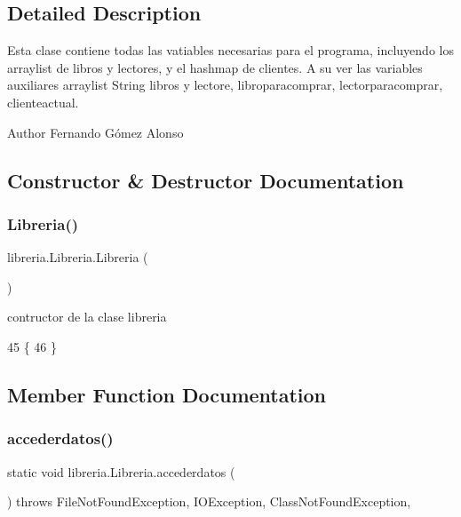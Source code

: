 \subsection{Detailed Description}
Esta clase contiene todas las vatiables necesarias para el programa, incluyendo los arraylist de libros y lectores, y el hashmap de clientes. A su ver las variables auxiliares arraylist String libros y lectore, libroparacomprar, lectorparacomprar, clienteactual.

\begin{DoxyAuthor}{Author}
Fernando Gómez Alonso 
\end{DoxyAuthor}


\subsection{Constructor \& Destructor Documentation}
\mbox{\label{classlibreria_1_1_libreria_a93220dd4de47ee3b7ef4b2a90701c253}} 
\subsubsection{\texorpdfstring{Libreria()}{Libreria()}}
{\footnotesize\ttfamily libreria.\+Libreria.\+Libreria (\begin{DoxyParamCaption}{ }\end{DoxyParamCaption})\hspace{0.3cm}{\ttfamily [inline]}}

contructor de la clase libreria 
\begin{DoxyCode}
45                       \{
46      \}
\end{DoxyCode}


\subsection{Member Function Documentation}
\mbox{\label{classlibreria_1_1_libreria_a0ebf81d2e66a26a82de5b997aae37065}} 
\subsubsection{\texorpdfstring{accederdatos()}{accederdatos()}}
{\footnotesize\ttfamily static void libreria.\+Libreria.\+accederdatos (\begin{DoxyParamCaption}{ }\end{DoxyParamCaption}) throws File\+Not\+Found\+Exception, I\+O\+Exception, Class\+Not\+Found\+Exception\hspace{0.3cm}{\ttfamily [inline]}, {\ttfamily [static]}}


